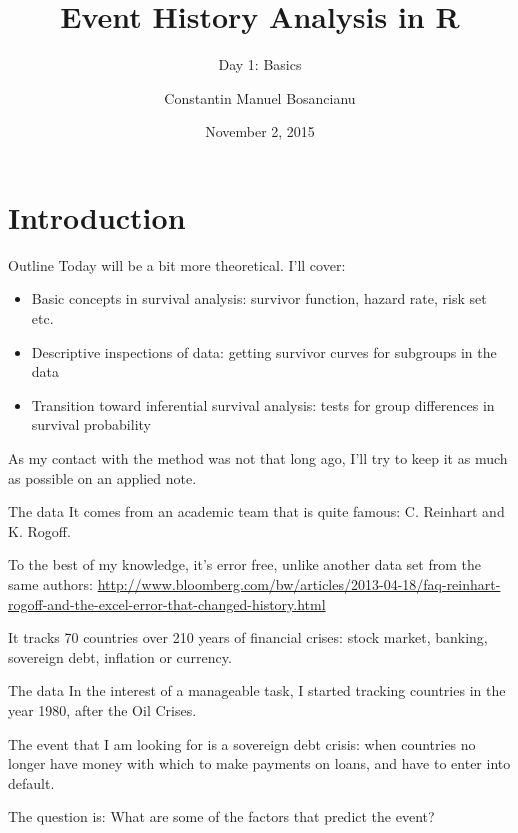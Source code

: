 \documentclass[12pt,english,pdf,xcolor=dvipsnames,aspectratio=169]{beamer}\usepackage[]{graphicx}\usepackage[]{xcolor}
\title{Event History Analysis in R}
\subtitle{Day 1: Basics}
\author{Constantin Manuel Bosancianu}
\institute{Doctoral School of Political Science \\ Central European University, Budapest \\ \href{mailto:bosancianu@icloud.com}{bosancianu@icloud.com}}
\date{November 2, 2015}
\begin{document}
\maketitle




\section{Introduction}

\begin{frame}{Outline}
Today will be a bit more theoretical. I'll cover:

\begin{itemize}
\item Basic concepts in survival analysis: survivor function, hazard rate, risk set etc.
\item Descriptive inspections of data: getting survivor curves for subgroups in the data
\item Transition toward inferential survival analysis: tests for group differences in survival probability
\end{itemize}
  
As my contact with the method was not that long ago, I'll try to keep it as much as possible on an applied note.
\end{frame}


\begin{frame}{The data}
It comes from an academic team that is quite famous: C. Reinhart and K. Rogoff.\bigskip

To the best of my knowledge, it's error free, unlike another data set from the same authors: \url{http://www.bloomberg.com/bw/articles/2013-04-18/faq-reinhart-rogoff-and-the-excel-error-that-changed-history.html}\bigskip

It tracks 70 countries over 210 years of financial crises: stock market, banking, sovereign debt, inflation or currency.
\end{frame}

\begin{frame}{The data}
In the interest of a manageable task, I started tracking countries in the year 1980, after the Oil Crises.\bigskip

The event that I am looking for is a sovereign debt crisis: when countries no longer have money with which to make payments on loans, and have to enter into default.\bigskip

The question is: What are some of the factors that predict the event?
\end{frame}
\end{document}
